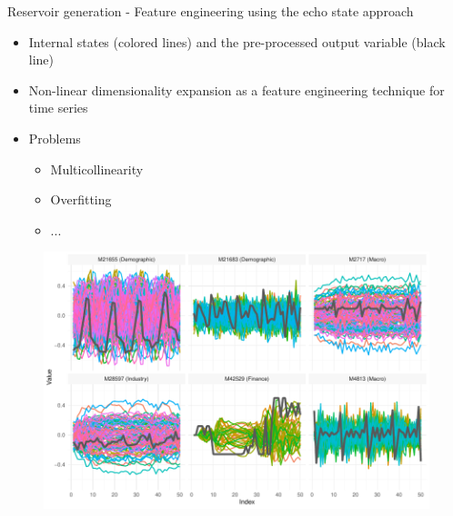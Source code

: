 \documentclass[aspectratio=169]{beamer}
\begin{document}
\begin{frame}[t]{Reservoir generation - Feature engineering using the echo state approach}
    \begin{minipage}[t]{0.3\textwidth}
        \vspace{0pt}
        \begin{itemize}
            \item Internal states (colored lines) and the pre-processed output variable (black line)
			\item Non-linear dimensionality expansion as a feature engineering technique for time series
			\item Problems
				\begin{itemize}
					\item Multicollinearity
					\item Overfitting
					\item ...
				\end{itemize}
        \end{itemize}
    \end{minipage}%
    \hfill
    \begin{minipage}[t]{0.7\textwidth}
        \vspace{0pt}
 		\begin{figure}[H]
		\center
			\includegraphics[scale=0.7]{figures/figure_05_model_states_wide.pdf}
		\end{figure}
    \end{minipage}
\end{frame}
\end{document}
